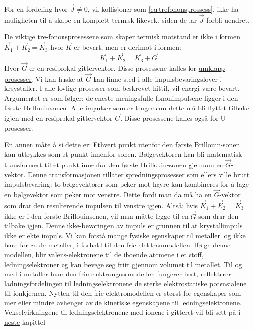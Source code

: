 \documentclass{article}
\begin{document}
For en fordeling hvor $\vec{J} \ne 0$, vil kollisjoner som \ref{eq:trefononsprossess}, ikke ha muligheten til å skape en komplett termisk likevekt siden de lar $\vec{J}$ forbli uendret.

De viktige tre-fononsprosessene som skaper termisk motstand er ikke i formen $\vec{K}_1 + \vec{K}_2 = \vec{K}_3$ hvor $\vec{K}$ er bevart, men er derimot i formen:
\begin{equation}
    \vec{K}_1 + \vec{K}_2 = \vec{K}_3 + \vec{G}
\end{equation}
Hvor $\vec{G}$ er en resiprokal gittervektor. Disse prosessene kalles for \underline{umklapp prosesser}. Vi kan huske at $\vec{G}$ kan finne sted i alle impulsbevaringslover i krsystaller. I alle lovlige prosesser som beskrevet hittil, vil energi være bevart. Argumentet er som følger: de eneste meningsfulle fononimpulsene ligger i den første Brillouinsonen. Alle impulser som er lengre enn dette må bli flyttet tilbake igjen med en resiprokal gittervektor $\vec{G}$. Disse prosessene kalles også for U prosesser. 

En annen måte å si dette er: Ethvert punkt utenfor den første Brillouin-sonen kan uttrykkes som et punkt innenfor sonen. Bølgevektoren kan bli matematisk transformert til et punkt innenfor den første Brillouin-sonen gjennom en $\vec{G}$-vektor. Denne transformasjonen tillater spredningsprosesser som ellers ville brutt impulsbevaring: to bølgevektorer som peker mot høyre kan kombineres for å lage en bølgevektor som peker mot venstre. Dette fordi man da må ha en $\vec{G}$-vektor som drar den resulterende impulsen til venstre igjen. Altså: hvis $\vec{K}_1 + \vec{K}_2 = \vec{K}_3$ ikke er i den første Brillouinsonen, vil man måtte legge til en $\vec{G}$ som drar den tilbake igjen. Denne ikke-bevaringen av impuls er grunnen til at krystallimpuls ikke er ekte impuls.
\nyside
{}
Vi kan forstå mange fysiske egenskaper til metaller, og ikke bare for enkle metaller, i forhold til den frie elektronmodellen. Ifølge denne modellen, blir valens-elektronene til de iboende atomene i et stoff, ledningselektroner og kan bevege seg fritt gjennom volumet til metallet. Til og med i metaller hvor den frie elektrongassmodellen fungerer best, reflekterer ladningsfordelingen til ledningselektronene de sterke elektrostatiske potensialene til ionkjernen. Nytten til den frie elektromodellen er størst for egenskaper som mer eller mindre avhenger av de kinetiske egenskapene til ledningselektronene. Vekselvirkningene til ledningselektronene med ionene i gitteret vil bli sett på i \underline{neste} kapittel
\end{document}
